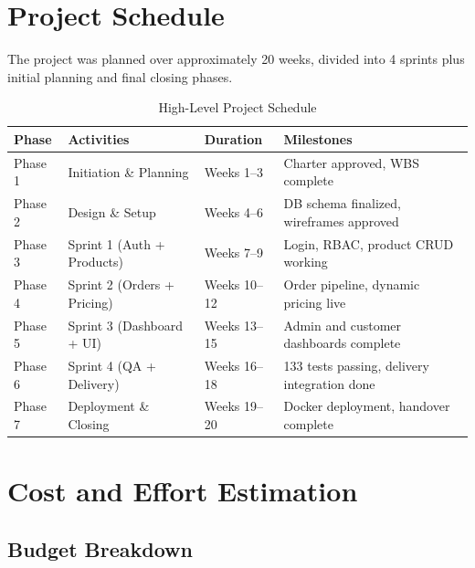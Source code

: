 \documentclass[12pt,a4paper]{report}
\begin{document}
\section{Project Schedule}

The project was planned over approximately 20 weeks, divided into 4 sprints plus initial planning and final closing phases.

\begin{table}[H]
  \centering
  \caption{High-Level Project Schedule}
  \begin{tabularx}{\textwidth}{L{1.5cm} L{3.5cm} L{3cm} X}
    \toprule
    \textbf{Phase} & \textbf{Activities} & \textbf{Duration} & \textbf{Milestones} \\
    \midrule
    Phase 1 & Initiation \& Planning      & Weeks 1--3  & Charter approved, WBS complete \\
    Phase 2 & Design \& Setup             & Weeks 4--6  & DB schema finalized, wireframes approved \\
    Phase 3 & Sprint 1 (Auth + Products)  & Weeks 7--9  & Login, RBAC, product CRUD working \\
    Phase 4 & Sprint 2 (Orders + Pricing) & Weeks 10--12 & Order pipeline, dynamic pricing live \\
    Phase 5 & Sprint 3 (Dashboard + UI)   & Weeks 13--15 & Admin and customer dashboards complete \\
    Phase 6 & Sprint 4 (QA + Delivery)    & Weeks 16--18 & 133 tests passing, delivery integration done \\
    Phase 7 & Deployment \& Closing       & Weeks 19--20 & Docker deployment, handover complete \\
    \bottomrule
  \end{tabularx}
\end{table}

\section{Cost and Effort Estimation}

\subsection{Budget Breakdown}
\end{document}
